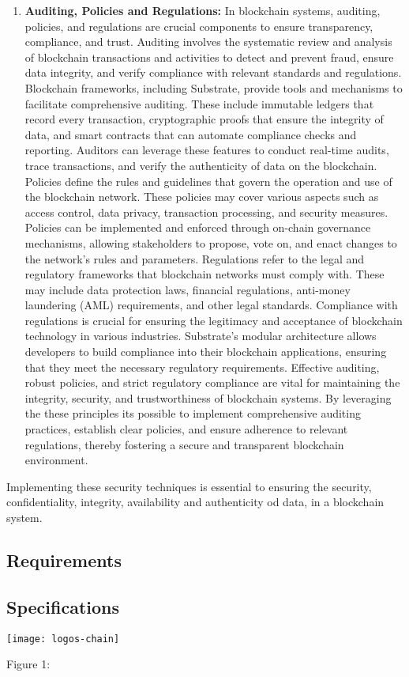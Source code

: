 \begin{enumerate}[label=(\arabic*)]
	\item\textbf{Auditing, Policies and Regulations:} 
    In blockchain systems, auditing, policies, and regulations are crucial components to ensure transparency, compliance, and trust. Auditing involves the systematic review and analysis of blockchain transactions and activities to detect and prevent fraud, ensure data integrity, and verify compliance with relevant standards and regulations.
	Blockchain frameworks, including Substrate, provide tools and mechanisms to facilitate comprehensive auditing. These include immutable ledgers that record every transaction, cryptographic proofs that ensure the integrity of data, and smart contracts that can automate compliance checks and reporting. Auditors can leverage these features to conduct real-time audits, trace transactions, and verify the authenticity of data on the blockchain.
	Policies define the rules and guidelines that govern the operation and use of the blockchain network. These policies may cover various aspects such as access control, data privacy, transaction processing, and security measures. Policies can be implemented and enforced through on-chain governance mechanisms, allowing stakeholders to propose, vote on, and enact changes to the network's rules and parameters.
	Regulations refer to the legal and regulatory frameworks that blockchain networks must comply with. These may include data protection laws, financial regulations, anti-money laundering (AML) requirements, and other legal standards. Compliance with regulations is crucial for ensuring the legitimacy and acceptance of blockchain technology in various industries. Substrate's modular architecture allows developers to build compliance into their blockchain applications, ensuring that they meet the necessary regulatory requirements.
	Effective auditing, robust policies, and strict regulatory compliance are vital for maintaining the integrity, security, and trustworthiness of blockchain systems. By leveraging the these principles its possible to implement comprehensive auditing practices, establish clear policies, and ensure adherence to relevant regulations, thereby fostering a secure and transparent blockchain environment.

\end{enumerate}

Implementing these security techniques is essential to ensuring the security, confidentiality, integrity, availability and authenticity od data, in a blockchain system.

\subsection{Requirements}

\subsection{Specifications}

\begin{center}
	\texttt{[image: logos-chain]}
\end{center}
\begin{center}
	Figure 1: 
\end{center}